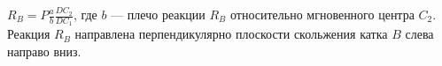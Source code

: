 $R_B = P\frac{a}{b}\frac{DC_2}{DC_1}$, где $b$ --- плечо реакции $R_B$
относительно мгновенного центра $C_2$.
Реакция $R_B$ направлена перпендикулярно плоскости скольжения катка $B$
слева направо вниз.
